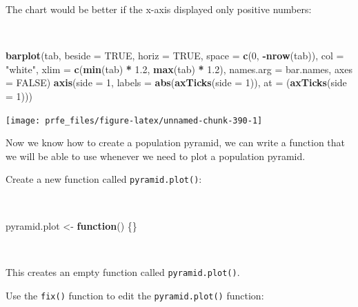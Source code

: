 \documentclass[12pt,a4paper]{book}
\newenvironment{Shaded}{\begin{snugshade}}{\end{snugshade}}
\newcommand{\ControlFlowTok}[1]{\textcolor[rgb]{0.13,0.29,0.53}{\textbf{#1}}}
\newcommand{\DataTypeTok}[1]{\textcolor[rgb]{0.13,0.29,0.53}{#1}}
\newcommand{\DecValTok}[1]{\textcolor[rgb]{0.00,0.00,0.81}{#1}}
\newcommand{\FloatTok}[1]{\textcolor[rgb]{0.00,0.00,0.81}{#1}}
\newcommand{\KeywordTok}[1]{\textcolor[rgb]{0.13,0.29,0.53}{\textbf{#1}}}
\newcommand{\NormalTok}[1]{#1}
\newcommand{\OperatorTok}[1]{\textcolor[rgb]{0.81,0.36,0.00}{\textbf{#1}}}
\newcommand{\OtherTok}[1]{\textcolor[rgb]{0.56,0.35,0.01}{#1}}
\newcommand{\StringTok}[1]{\textcolor[rgb]{0.31,0.60,0.02}{#1}}
\theoremstyle{definition}
\theoremstyle{definition}
\theoremstyle{definition}
\theoremstyle{remark}
\begin{document}
The chart would be better if the x-axis displayed only positive numbers:

~

\begin{Shaded}
\begin{Highlighting}[]
\KeywordTok{barplot}\NormalTok{(tab, }\DataTypeTok{beside =} \OtherTok{TRUE}\NormalTok{, }\DataTypeTok{horiz =} \OtherTok{TRUE}\NormalTok{, }\DataTypeTok{space =} \KeywordTok{c}\NormalTok{(}\DecValTok{0}\NormalTok{, }\OperatorTok{-}\KeywordTok{nrow}\NormalTok{(tab)),}
        \DataTypeTok{col =} \StringTok{"white"}\NormalTok{, }\DataTypeTok{xlim =} \KeywordTok{c}\NormalTok{(}\KeywordTok{min}\NormalTok{(tab) }\OperatorTok{*}\StringTok{ }\FloatTok{1.2}\NormalTok{, }\KeywordTok{max}\NormalTok{(tab) }\OperatorTok{*}\StringTok{ }\FloatTok{1.2}\NormalTok{),}
        \DataTypeTok{names.arg =}\NormalTok{ bar.names, }\DataTypeTok{axes =} \OtherTok{FALSE}\NormalTok{)}
\KeywordTok{axis}\NormalTok{(}\DataTypeTok{side =} \DecValTok{1}\NormalTok{,}
     \DataTypeTok{labels =} \KeywordTok{abs}\NormalTok{(}\KeywordTok{axTicks}\NormalTok{(}\DataTypeTok{side =} \DecValTok{1}\NormalTok{)),}
     \DataTypeTok{at =}\NormalTok{ (}\KeywordTok{axTicks}\NormalTok{(}\DataTypeTok{side =} \DecValTok{1}\NormalTok{)))}
\end{Highlighting}
\end{Shaded}

\newpage

\begin{center}\texttt{[image: prfe\_files/figure-latex/unnamed-chunk-390-1]} \end{center}

Now we know how to create a population pyramid, we can write a function
that we will be able to use whenever we need to plot a population
pyramid.

Create a new function called \texttt{pyramid.plot()}:

~

\begin{Shaded}
\begin{Highlighting}[]
\NormalTok{pyramid.plot <-}\StringTok{ }\ControlFlowTok{function}\NormalTok{() \{\}}
\end{Highlighting}
\end{Shaded}

~

This creates an empty function called \texttt{pyramid.plot()}.

Use the \texttt{fix()} function to edit the \texttt{pyramid.plot()}
function:
\end{document}
